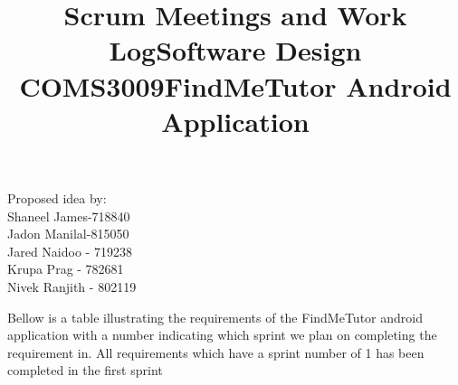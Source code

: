 \documentclass[12pt]{article}
\begin{document}
\title{\textbf{Scrum Meetings and Work Log}}
\maketitle
\begin{center}
\title{\textbf{Software Design COMS3009}}
\maketitle 

\title{\textbf{FindMeTutor Android Application}}
\maketitle 
\end{center}


\begin{center}
Proposed idea by:\\
Shaneel James-718840
\\Jadon Manilal-815050
\\Jared Naidoo - 719238
\\Krupa Prag - 782681
\\Nivek Ranjith - 802119
\end{center}

\newpage






\tableofcontents
\newpage
\begin{flushleft}

Bellow is a table illustrating the requirements of the FindMeTutor android application with a number indicating which sprint we plan on completing the requirement in. All requirements which have a sprint number of 1 has been completed in the first sprint\\
\end{flushleft}
\end{document}

